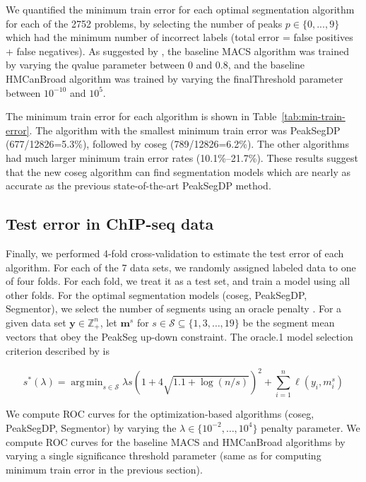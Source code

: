 \documentclass{article}
\DeclareMathOperator*{\argmin}{arg\,min}
\newcommand{\ZZ}{\mathbb Z}
\begin{document}
We quantified the minimum train error for each optimal segmentation
algorithm for each of the 2752 problems, by selecting the number of
peaks $p\in\{0, ..., 9\}$ which had the minimum number of incorrect
labels (total error = false positives + false negatives). As suggested
by \citet{HOCKING2016-chipseq}, the baseline MACS algorithm was
trained by varying the qvalue parameter between 0 and 0.8, and the
baseline HMCanBroad algorithm was trained by varying the
finalThreshold parameter between $10^{-10}$ and $10^5$.

The minimum train error for each algorithm is shown in
Table~\ref{tab:min-train-error}. The algorithm with the smallest
minimum train error was PeakSegDP (677/12826=5.3\%), followed by coseg
(789/12826=6.2\%). The other algorithms had much larger minimum train
error rates (10.1\%--21.7\%). These results suggest that the new coseg
algorithm can find segmentation models which are nearly as accurate as
the previous state-of-the-art PeakSegDP method.


\subsection{Test error in ChIP-seq data}

Finally, we performed 4-fold cross-validation to estimate the test
error of each algorithm. For each of the 7 data sets, we randomly
assigned labeled data to one of four folds. For each fold, we treat it
as a test set, and train a model using all other folds. For the
optimal segmentation models (coseg, PeakSegDP, Segmentor), we select
the number of segments using an oracle penalty
\citep{cleynen2013segmentation}. For a given data set
$\mathbf y\in\ZZ_+^n$, let $\mathbf m^s$ for
$s\in\mathcal S\subseteq \{1, 3,\dots, 19\}$ be the segment mean
vectors that obey the PeakSeg up-down constraint. The oracle.1 model
selection criterion described by \citet{HOCKING-PeakSeg} is

\begin{equation}
  \label{eq:oracle}
  s^*(\lambda) = \argmin_{s\in\mathcal S}
  \lambda s\left(1 + 4\sqrt{1.1 + \log(n/s)}\right)^2
  +\sum_{i=1}^n \ell(y_i, m_i^s)
\end{equation}

We compute ROC curves for the optimization-based algorithms (coseg,
PeakSegDP, Segmentor) by varying the
$\lambda\in\{10^{-2}, \dots,10^4\}$ penalty parameter. We compute ROC
curves for the baseline MACS and HMCanBroad algorithms by varying a
single significance threshold parameter (same as for computing minimum
train error in the previous section).
\end{document}
